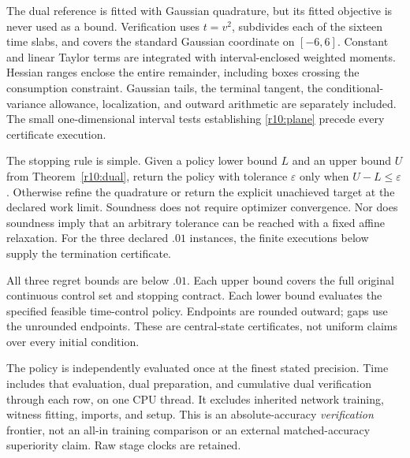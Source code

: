 The dual reference is fitted with Gaussian quadrature, but its fitted objective is never used as a bound. Verification uses $t=v^2$, subdivides each of the sixteen time slabs, and covers the standard Gaussian coordinate on $[-6,6]$. Constant and linear Taylor terms are integrated with interval-enclosed weighted moments. Hessian ranges enclose the entire remainder, including boxes crossing the consumption constraint. Gaussian tails, the terminal tangent, the conditional-variance allowance, localization, and outward arithmetic are separately included. The small one-dimensional interval tests establishing \eqref{r10:plane} precede every certificate execution.

The stopping rule is simple. Given a policy lower bound $L$ and an upper bound $U$ from Theorem~\ref{r10:dual}, return the policy with tolerance $\varepsilon$ only when $U-L\leq\varepsilon$. Otherwise refine the quadrature or return the explicit unachieved target at the declared work limit. Soundness does not require optimizer convergence. Nor does soundness imply that an arbitrary tolerance can be reached with a fixed affine relaxation. For the three declared $.01$ instances, the finite executions below supply the termination certificate.

\begin{table}[t]\centering\small
\caption{Original flexible-economy certificates after output polishing}\label{r10:tab:original}

\par\smallskip\footnotesize All three regret bounds are below $.01$. Each upper bound covers the full original continuous control set and stopping contract. Each lower bound evaluates the specified feasible time-control policy. Endpoints are rounded outward; gaps use the unrounded endpoints. These are central-state certificates, not uniform claims over every initial condition.
\end{table}

\begin{table}[t]\centering\small
\caption{Verified work needed to cross the absolute-error target}\label{r10:tab:frontier}

\par\smallskip\footnotesize The policy is independently evaluated once at the finest stated precision. Time includes that evaluation, dual preparation, and cumulative dual verification through each row, on one CPU thread. It excludes inherited network training, witness fitting, imports, and setup. This is an absolute-accuracy \emph{verification} frontier, not an all-in training comparison or an external matched-accuracy superiority claim. Raw stage clocks are retained.
\end{table}

